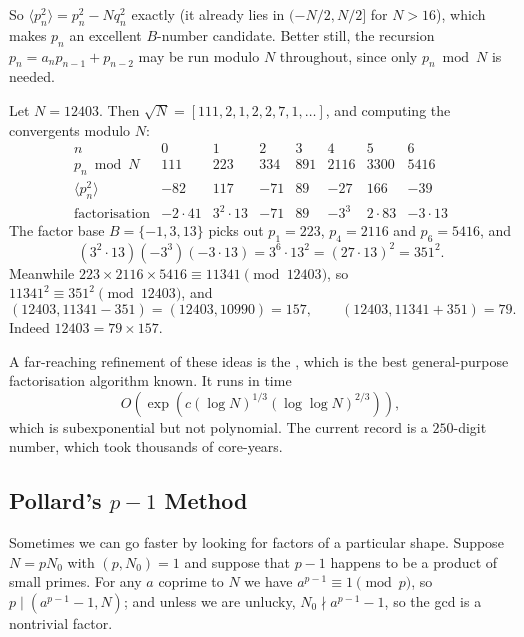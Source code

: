 So $\langle p_n^2\rangle = p_n^2 - Nq_n^2$ exactly (it already lies in $(-N/2, N/2]$ for $N > 16$), which makes $p_n$ an excellent $B$-number candidate. Better still, the recursion $p_n = a_np_{n-1}+p_{n-2}$ may be run modulo $N$ throughout, since only $p_n \bmod N$ is needed.

\begin{example}
	Let $N = 12403$. Then $\sqrt N = [111, 2, 1, 2, 2, 7, 1, \dots]$, and computing the convergents modulo $N$:
	$$
	\begin{array}{c|ccccccc}
		n & 0 & 1 & 2 & 3 & 4 & 5 & 6 \\ \hline
		p_n \bmod N & 111 & 223 & 334 & 891 & 2116 & 3300 & 5416 \\
		\langle p_n^2\rangle & -82 & 117 & -71 & 89 & -27 & 166 & -39 \\
		\text{factorisation} & -2\cdot41 & 3^2\cdot13 & -71 & 89 & -3^3 & 2\cdot83 & -3\cdot13
	\end{array}
	$$
	The factor base $B = \{-1, 3, 13\}$ picks out $p_1 = 223$, $p_4 = 2116$ and $p_6 = 5416$, and
	$$
	(3^2\cdot13)(-3^3)(-3\cdot13) = 3^6\cdot13^2 = (27\cdot13)^2 = 351^2.
	$$
	Meanwhile $223\times2116\times5416 \equiv 11341 \pmod{12403}$, so $11341^2 \equiv 351^2 \pmod{12403}$, and
	$$
	(12403, 11341 - 351) = (12403, 10990) = 157, \qquad (12403, 11341+351) = 79.
	$$
	Indeed $12403 = 79\times157$.
\end{example}

\begin{remark}
	A far-reaching refinement of these ideas is the , which is the best general-purpose factorisation algorithm known. It runs in time
	$$
	O\!\left(\exp\left(c(\log N)^{1/3}(\log\log N)^{2/3}\right)\right),
	$$
	which is subexponential but not polynomial. The current record is a $250$-digit number, which took thousands of core-years.
\end{remark}

\subsection{Pollard's $p - 1$ Method}

Sometimes we can go faster by looking for factors of a particular shape. Suppose $N = pN_0$ with $(p, N_0) = 1$ and suppose that $p - 1$ happens to be a product of small primes. For any $a$ coprime to $N$ we have $a^{p-1}\equiv 1 \pmod p$, so $p \mid (a^{p-1}-1, N)$; and unless we are unlucky, $N_0 \nmid a^{p-1}-1$, so the gcd is a nontrivial factor.

